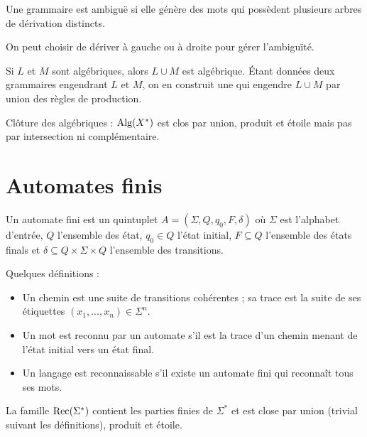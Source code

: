 \documentclass[a4paper]{article}
\begin{document}
\begin{defi}
Une grammaire est ambiguë si elle génère des mots qui possèdent plusieurs arbres de dérivation distincts.
\end{defi}

On peut choisir de dériver à gauche ou à droite pour gérer l'ambiguïté.

\begin{prop}
Si $L$ et $M$ sont algébriques, alors $L\cup M$ est algébrique. \'Etant données deux grammaires engendrant $L$ et $M$, on en construit une qui engendre $L\cup M$ par union des règles de production.
\end{prop}

Clôture des algébriques : $\textnormal{Alg}(X^*)$ est clos par union, produit et étoile mais pas par intersection ni complémentaire.


\section{Automates finis}

\begin{defi}
Un automate fini est un quintuplet $A=(\Sigma,Q,q_0,F,\delta)$ où $\Sigma$ est l'alphabet d'entrée, $Q$ l'ensemble des état, $q_0\in Q$ l'état initial, $F\subseteq Q$ l'ensemble des états finals et $\delta\subseteq Q\times\Sigma\times Q$ l'ensemble des transitions.
\end{defi}

\begin{defi} Quelques définitions :\begin{itemize}
  \item Un chemin est une suite de transitions cohérentes ; sa trace est la suite de ses étiquettes $(x_1,...,x_n)\in \Sigma^n$.
  \item Un mot est reconnu par un automate s'il est la trace d'un chemin menant de l'état initial vers un état final.
  \item Un langage est reconnaissable s'il existe un automate fini qui reconnaît tous ses mots.
\end{itemize}\end{defi}

\begin{prop}
La famille $\textnormal{Rec}(\Sigma^*)$ contient les parties finies de $\Sigma^*$ et est close par union (trivial suivant les définitions), produit et étoile.
\end{prop}
\end{document}
